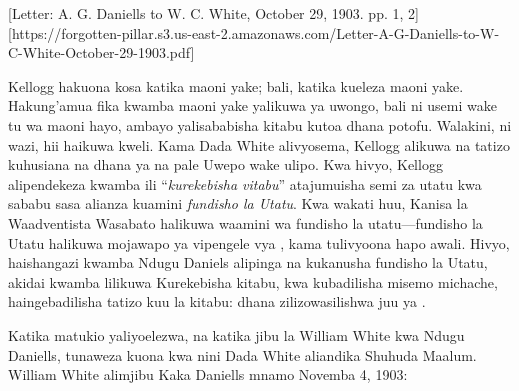 


[Letter: A. G. Daniells to W. C. White, October 29, 1903. pp. 1, 2][https://forgotten-pillar.s3.us-east-2.amazonaws.com/Letter-A-G-Daniells-to-W-C-White-October-29-1903.pdf]


Kellogg hakuona kosa katika maoni yake; bali, katika kueleza maoni yake. Hakung'amua fika kwamba maoni yake yalikuwa ya uwongo, bali ni usemi wake tu wa maoni hayo, ambayo yalisababisha kitabu kutoa dhana potofu. Walakini, ni wazi, hii haikuwa kweli. Kama Dada White alivyosema, Kellogg alikuwa na tatizo kuhusiana na dhana ya  na pale Uwepo wake ulipo. Kwa hivyo, Kellogg alipendekeza kwamba ili “\textit{kurekebisha vitabu}” atajumuisha semi za utatu kwa sababu sasa alianza kuamini \textit{fundisho la Utatu}. Kwa wakati huu, Kanisa la Waadventista Wasabato halikuwa waamini wa fundisho la utatu—fundisho la Utatu halikuwa mojawapo ya vipengele vya , kama tulivyoona hapo awali. Hivyo, haishangazi kwamba Ndugu Daniels alipinga na kukanusha fundisho la Utatu, akidai kwamba lilikuwa Kurekebisha kitabu, kwa kubadilisha misemo michache, haingebadilisha tatizo kuu la kitabu: dhana zilizowasilishwa juu ya .


Katika matukio yaliyoelezwa, na katika jibu la William White kwa Ndugu Daniells, tunaweza kuona kwa nini Dada White aliandika Shuhuda Maalum. William White alimjibu Kaka Daniells mnamo Novemba 4, 1903:








